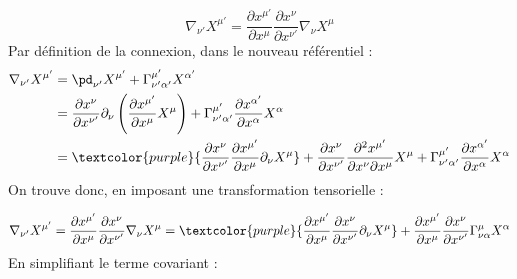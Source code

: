 \begin{equation}
    \nabla_{\nu '}X^{\mu '} = \frac{\partial x^{\mu'}}{\partial x^{\mu}}\frac{\partial x^{\nu}}{\partial x^{\nu '}}\nabla_{\nu }X^{\mu }
\end{equation}
Par définition de la connexion, dans le nouveau référentiel :
\begin{align}
    \nabla_{\nu '}X^{\mu '} &= \pd_{\nu'} X^{\mu'} + \Gamma^{\mu'}_{\nu'\alpha'} X^{\alpha'}\\
    &=\frac{\partial x^{\nu}}{\partial x^{\nu '}}\partial_{\nu}\left(\frac{\partial x^{\mu'}}{\partial x^{\mu}} X^{\mu}\right) + \Gamma^{\mu '}_{\nu '\alpha '}\frac{\partial x^{\alpha '}}{\partial x^{\alpha }} X^{\alpha}\\
    &= \textcolor{purple}{\frac{\partial x^{\nu}}{\partial x^{\nu '}}\frac{\partial x^{\mu'}}{\partial x^{\mu}}\partial_{\nu}X^{\mu}} +\frac{\partial x^{\nu}}{\partial x^{\nu '}}\frac{\partial^2 x^{\mu'}}{\partial x^{\nu} \partial x^{\mu}}X^{\mu}  + \Gamma^{\mu '}_{\nu '\alpha '}\frac{\partial x^{\alpha '}}{\partial x^{\alpha }} X^{\alpha}
\end{align}
On trouve donc, en imposant une transformation tensorielle :

\begin{align}
    \nabla_{\nu'} X^{\mu'} = \frac{\partial x^{\mu'}}{\partial x^{\mu}}\frac{\partial x^{\nu}}{\partial x^{\nu '}}\nabla_{\nu }X^{\mu } = \textcolor{purple}{\frac{\partial x^{\mu'}}{\partial x^{\mu}}\frac{\partial x^{\nu}}{\partial x^{\nu '}}\partial_{\nu}X^{\mu}} + \frac{\partial x^{\mu'}}{\partial x^{\mu}}\frac{\partial x^{\nu}}{\partial x^{\nu '}}\Gamma^{\mu }_{\nu \alpha}X^{\alpha }
\end{align}
En simplifiant le terme covariant :

